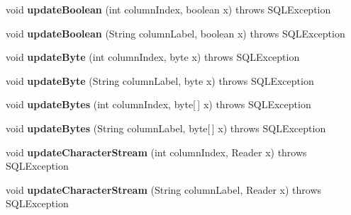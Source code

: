 \begin{DoxyCompactItemize}
void {\bfseries update\+Boolean} (int column\+Index, boolean x)  throws S\+Q\+L\+Exception 
\item 
\mbox{\label{classsimpledb_1_1jdbc_1_1ResultSetAdapter_af8a91db0865ba26a13ae1ae4e919c626}} 
void {\bfseries update\+Boolean} (String column\+Label, boolean x)  throws S\+Q\+L\+Exception 
\item 
\mbox{\label{classsimpledb_1_1jdbc_1_1ResultSetAdapter_acad4373c3df50e96cfebf930c9a65e9d}} 
void {\bfseries update\+Byte} (int column\+Index, byte x)  throws S\+Q\+L\+Exception 
\item 
\mbox{\label{classsimpledb_1_1jdbc_1_1ResultSetAdapter_a203142213e1946a25017d230c48d0383}} 
void {\bfseries update\+Byte} (String column\+Label, byte x)  throws S\+Q\+L\+Exception 
\item 
\mbox{\label{classsimpledb_1_1jdbc_1_1ResultSetAdapter_a614f9fbc90e927a6493a4cb1d506a129}} 
void {\bfseries update\+Bytes} (int column\+Index, byte\mbox{[}$\,$\mbox{]} x)  throws S\+Q\+L\+Exception 
\item 
\mbox{\label{classsimpledb_1_1jdbc_1_1ResultSetAdapter_a4ae8a4af12445e4f5649a7404eff2c7a}} 
void {\bfseries update\+Bytes} (String column\+Label, byte\mbox{[}$\,$\mbox{]} x)  throws S\+Q\+L\+Exception 
\item 
\mbox{\label{classsimpledb_1_1jdbc_1_1ResultSetAdapter_a114fac11d22cff60c0b75b54e3609fea}} 
void {\bfseries update\+Character\+Stream} (int column\+Index, Reader x)  throws S\+Q\+L\+Exception 
\item 
\mbox{\label{classsimpledb_1_1jdbc_1_1ResultSetAdapter_a170f174203a533ec8ac14131b8b55f5e}} 
void {\bfseries update\+Character\+Stream} (String column\+Label, Reader x)  throws S\+Q\+L\+Exception 
\item 
\mbox{\label{classsimpledb_1_1jdbc_1_1ResultSetAdapter_a9ef61a3913fb0c83cadfd1030ed328ef}} 

\end{DoxyCompactItemize}
